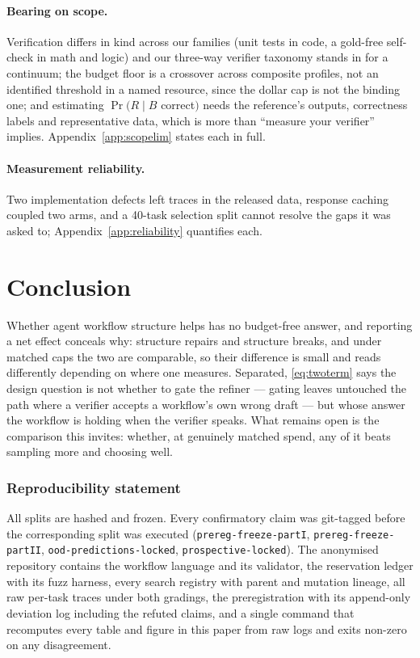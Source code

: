 \documentclass{article}
\begin{document}
\paragraph{Bearing on scope.} Verification differs in kind across our families
(unit tests in code, a gold-free self-check in math and logic) and our
three-way verifier taxonomy stands in for a continuum; the budget floor is a
crossover across composite profiles, not an identified threshold in a named
resource, since the dollar cap is not the binding one; and estimating
$\Pr(R \mid B$ correct$)$ needs the reference's outputs, correctness labels and
representative data, which is more than ``measure your verifier'' implies.
Appendix~\ref{app:scopelim} states each in full.

\paragraph{Measurement reliability.} Two implementation defects left traces in
the released data, response caching coupled two arms, and a 40-task selection
split cannot resolve the gaps it was asked to; Appendix~\ref{app:reliability}
quantifies each.

\section{Conclusion}

Whether agent workflow structure helps has no budget-free answer, and reporting
a net effect conceals why: structure repairs and structure breaks, and under
matched caps the two are comparable, so their difference is small and reads
differently depending on where one measures. Separated, \eqref{eq:twoterm} says
the design question is not whether to gate the refiner --- gating leaves untouched
the path where a verifier accepts a workflow's own wrong draft --- but whose
answer the workflow is holding when the verifier speaks. What remains open is
the comparison this invites: whether, at genuinely matched spend, any of it
beats sampling more and choosing well.

\subsubsection*{Reproducibility statement}

All splits are hashed and frozen. Every confirmatory claim was git-tagged before
the corresponding split was executed (\texttt{prereg-freeze-partI},
\texttt{prereg-freeze-partII}, \texttt{ood-predictions-locked},
\texttt{prospective-locked}). The anonymised repository contains the workflow
language and its validator, the reservation ledger with its fuzz harness, every
search registry with parent and mutation lineage, all raw per-task traces under
both gradings, the preregistration with its append-only deviation log including
the refuted claims, and a single command that recomputes every table and figure
in this paper from raw logs and exits non-zero on any disagreement.
\end{document}
